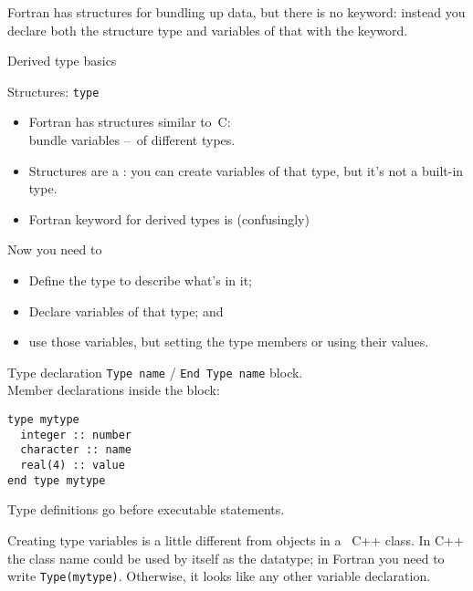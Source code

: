 
Fortran has structures for bundling up data, but there is no
 keyword: instead you declare both the structure type and
variables of that  with the 
 keyword. 

 {Derived type basics}

\begin{slide}{Structures: \noexpand\texttt{type}}
  \label{sl:ftype}
  \begin{itemize}
  \item Fortran has structures similar to~C:\\
    bundle variables --~of different types.
  \item Structures are a : you can create
    variables of that type, but it's not a built-in type.
  \item  Fortran keyword for derived types is (confusingly) 
  \end{itemize}
\end{slide}

Now you need to
\begin{itemize}
\item Define the type to describe what's in it;
\item Declare variables of that type; and
\item use those variables, but setting the type members or using their
  values.
\end{itemize}

\begin{block}{Type declaration}
  \label{sl:ftype-def}
  \lstinline{Type name} / \lstinline{End Type name} block.\\
  Member declarations inside the block:
\begin{lstlisting}
type mytype
  integer :: number
  character :: name
  real(4) :: value
end type mytype
\end{lstlisting}
  Type definitions go before executable statements.
\end{block}

Creating type variables is a little different from
objects in a ~C++ class.
In C++ the class name could be used by itself
as the datatype; in Fortran you need to write
\lstinline{Type(mytype)}.
Otherwise, it looks like any other variable declaration.

